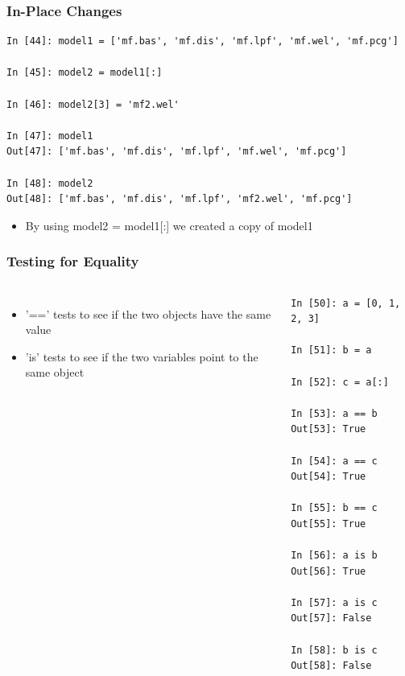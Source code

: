 \documentclass{beamer}
\begin{document}
\begin{frame}[fragile]
\frametitle{In-Place Changes}
  \begin{lstlisting}
In [44]: model1 = ['mf.bas', 'mf.dis', 'mf.lpf', 'mf.wel', 'mf.pcg']

In [45]: model2 = model1[:]

In [46]: model2[3] = 'mf2.wel'

In [47]: model1
Out[47]: ['mf.bas', 'mf.dis', 'mf.lpf', 'mf.wel', 'mf.pcg']

In [48]: model2
Out[48]: ['mf.bas', 'mf.dis', 'mf.lpf', 'mf2.wel', 'mf.pcg']
  \end{lstlisting}
\begin{itemize}
  \item By using model2 = model1[:] we created a copy of model1
\end{itemize}
\end{frame}

\begin{frame}[fragile]
\frametitle{Testing for Equality}
\begin{columns}[c]
\column{2.5in}
\begin{itemize}
  \item '==' tests to see if the two objects have the same value
  \item 'is' tests to see if the two variables point to the same object 
\end{itemize}

  \column{2.5in}
  \begin{lstlisting}
In [50]: a = [0, 1, 2, 3]

In [51]: b = a

In [52]: c = a[:]

In [53]: a == b
Out[53]: True

In [54]: a == c
Out[54]: True

In [55]: b == c
Out[55]: True

In [56]: a is b
Out[56]: True

In [57]: a is c
Out[57]: False

In [58]: b is c
Out[58]: False
  \end{lstlisting}


\end{columns}
\end{frame}
\end{document}
